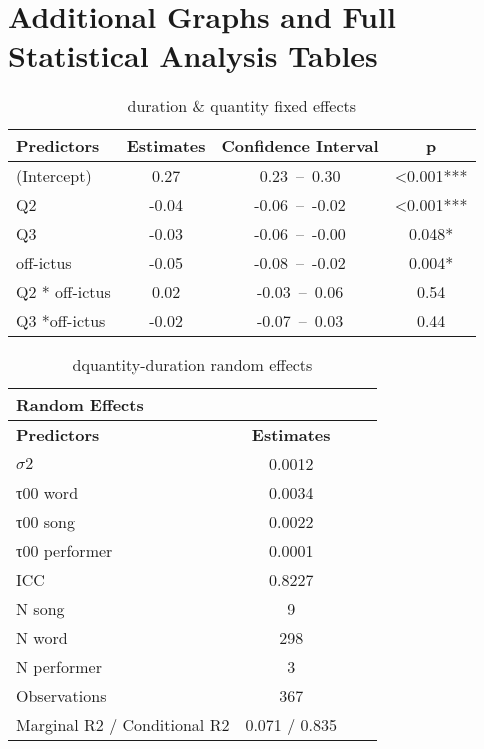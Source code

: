 \chapter{Additional Graphs and Full Statistical Analysis Tables}


\begin{table}[htp]
\caption{duration \& quantity fixed effects}
\begin{center}
\begin{tabular}{|l|c|c|c|}
\hline
{\bf Predictors}	&	{\bf Estimates}	&	{\bf Confidence Interval}	&	{\bf p}	\\
\hline
\hline
(Intercept)	&	0.27	&	0.23 – 0.30	&	<0.001***	\\
Q2	&	-0.04	&	-0.06 – -0.02	&	<0.001***	\\
Q3	&	-0.03	&	-0.06 – -0.00	&	0.048*	\\
off-ictus &	-0.05	&	-0.08 – -0.02	&	0.004*	\\
Q2 * off-ictus	&	0.02	&	-0.03 – 0.06	&	0.54	\\

Q3 *off-ictus	&	-0.02	&	-0.07 – 0.03	&	0.44	\\
\hline
\end{tabular}
\end{center}
\label{qdurfixed}
\end{table}%

\begin{table}[htp]
\caption{dquantity-duration random effects}
\begin{center}
\begin{tabular}{|l|c|c|c|}
\hline
{\bf Random Effects}	&		&		&		\\
\hline
{\bf Predictors}	&	{\bf Estimates} & & \\
\hline
$σ2$	&	0.0012	&		&		\\
τ00 word	&	0.0034	&		&		\\
τ00 song	&	0.0022	&		&		\\
τ00 performer	&	0.0001	&		&		\\
ICC	&	0.8227	&		&		\\
\hline
\hline
N song	&	9	&		&		\\
N word	&	298	&		&		\\
N performer	&	3	&		&		\\
Observations	&	367	&		&		\\
Marginal R2 / Conditional R2	&	0.071 / 0.835	&		&		\\
\hline
\end{tabular}
\end{center}
\label{qdurrandoms}
\end{table}%

